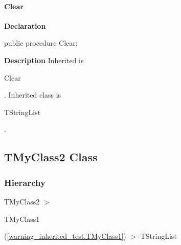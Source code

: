 \documentclass{report}
\newif\ifpdf
\begin{document}
\paragraph*{Clear}\hspace*{\fill}

\label{warning_inherited_test.TMyClass1-Clear}
\begin{list}{}{
\setlength{\itemindent}{0cm}
\setlength{\listparindent}{0cm}
\setlength{\leftmargin}{\evensidemargin}
\addtolength{\leftmargin}{\tmplength}
\settowidth{\labelsep}{X}
\addtolength{\leftmargin}{\labelsep}
\setlength{\labelwidth}{\tmplength}
}
\item[\textbf{Declaration}\hfill]
\ifpdf
\begin{flushleft}
\fi
\begin{ttfamily}
public procedure Clear;\end{ttfamily}

\ifpdf
\end{flushleft}
\fi

\par
\item[\textbf{Description}]
Inherited is \begin{ttfamily}Clear\end{ttfamily}. Inherited class is \begin{ttfamily}TStringList\end{ttfamily}.

\end{list}
\ifpdf
\subsection*{\large{\textbf{TMyClass2 Class}}\normalsize\hspace{1ex}\hrulefill}
\else
\subsection*{TMyClass2 Class}
\fi
\label{warning_inherited_test.TMyClass2}
\subsubsection*{\large{\textbf{Hierarchy}}\normalsize\hspace{1ex}\hfill}
TMyClass2 {$>$} \begin{ttfamily}TMyClass1\end{ttfamily}(\ref{warning_inherited_test.TMyClass1}) {$>$} 
TStringList
\end{document}
